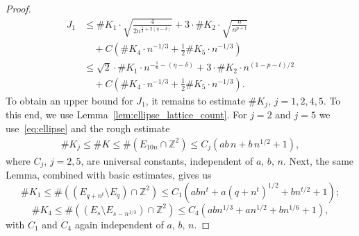 \documentclass[11pt]{amsart}
\numberwithin{equation}{section}
\newcommand{\Z}{{\mathbb Z}}
\begin{document}
\begin{proof}
    \begin{equation}\label{eq:sum_update}
        \begin{split}
          J_1
            & \leq \#K_1 \cdot \sqrt{\tfrac{4}{2 n^{\frac{1}{3}+2(\eta -\delta)}}} 
            + 3\cdot \#K_2\cdot \sqrt{\tfrac{n}{n^{p+t}}} \\
            & \quad + C \left(\#K_4\cdot n^{-1/3} +\tfrac{1}{2}\# K_5 \cdot n^{-1/3}\right) \\
            &\leq 
            \sqrt{2} \cdot \#K_1 \cdot n^{-\frac{1}{6}-(\eta-\delta)} 
            + 3 \cdot \#K_2\cdot n^{(1-p-t)/2}\\
            & \quad + C \left(\#K_4\cdot n^{-1/3} +\tfrac{1}{2}\# K_5 \cdot n^{-1/3}\right).
        \end{split}
    \end{equation}
    To obtain an upper bound for $J_1$, it remains to estimate $\#K_j$, $j=1,2,4,5$. To this end, we use Lemma~\ref{lem:ellipse_lattice_count}. For $j=2$ and $j=5$ we use~\eqref{eq:ellipse} and the rough estimate  
    \begin{align}\label{eq:K25ab}
        \# K_j
         \leq \#K \leq \#(E_{10n}\cap \Z^2)
         \leq C_j (ab \, n + b \, n^{1/2} + 1),
    \end{align}
    where $C_j$, $j=2,5$, are universal constants, independent of $a, \, b, \, n$.
    Next, the same Lemma, combined with basic estimates, gives us
    \begin{equation}\label{eq:K1ab}
        \# K_1 \leq \#((E_{q+n^t} \setminus E_{q})\cap \Z^2) \leq C_1 ( ab n^{t} + a(q+n^t)^{1/2} + bn^{t/2}+1);
    \end{equation}
    \begin{equation}\label{eq:K4ab}
        \# K_4 \leq \#((E_{s} \setminus E_{s-n^{1/3}})\cap \Z^2)
        \leq C_4 ( ab n^{1/3} + a n^{1/2} + bn^{1/6}+1),
    \end{equation}
    with $C_1$ and $C_4$ again independent of $a, \, b, \, n$.


\end{proof}
\end{document}
